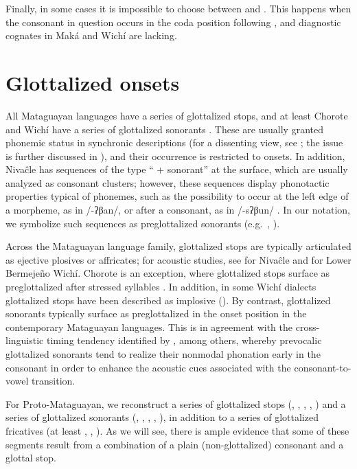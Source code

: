 Finally, in some cases it is impossible to choose between  and . This happens when the consonant in question occurs in the coda position following , and diagnostic cognates in Maká and Wichí are lacking.

\begin{exe}
    \ex \butterfly
\end{exe}

\section{Glottalized onsets}\label{glott-ons}
All Mataguayan languages have a series of glottalized stops, and at least Chorote and Wichí have a series of glottalized sonorants \citep{AnG-VN-21}. These are usually granted phonemic status in synchronic descriptions (for a dissenting view, see ; the issue is further discussed in ), and their occurrence is restricted to onsets. In addition, Nivaĉle has sequences of the type `` + sonorant'' at the surface, which are usually analyzed as consonant clusters; however, these sequences display phonotactic properties typical of phonemes, such as the possibility to occur at the left edge of a morpheme, as in /\mbox{-}ʔβan/, or after a consonant, as in /\mbox{-}sʔβun/ \citep{AnG21}. In our notation, we symbolize such sequences as preglottalized sonorants (e.g.~, ).

Across the Mataguayan language family, glottalized stops are typically articulated as ejective plosives or affricates; for acoustic studies, see \citet{AnG-GE-23} for Nivaĉle and \citet[79–82]{VN14} for Lower Bermejeño Wichí. Chorote is an exception, where glottalized stops surface as preglottalized after stressed syllables \citep[80–81]{JC14b}. In addition, in some Wichí dialects glottalized stops have been described as implosive (). By contrast, glottalized sonorants typically surface as preglottalized in the onset position in the contemporary Mataguayan languages. This is in agreement with the cross-linguistic timing tendency identified by \citet[394–396]{MGPL01}, among others, whereby prevocalic glottalized sonorants tend to realize their nonmodal phonation early in the consonant in order to enhance the acoustic cues associated with the consonant-to-vowel transition.

For Proto-Mataguayan, we reconstruct a series of glottalized stops (, , , , ) and a series of glottalized sonorants (, , , , ), in addition to a series of glottalized fricatives (at least , , ). As we will see, there is ample evidence that some of these segments result from a combination of a plain (non-glottalized) consonant and a glottal stop.

